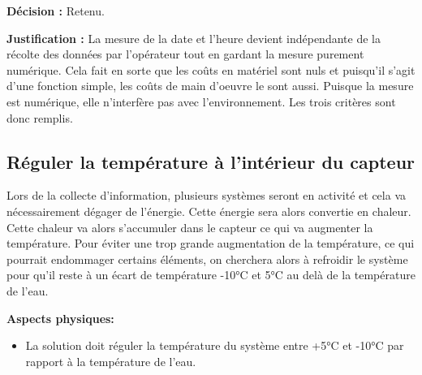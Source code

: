 \textbf{Décision :} Retenu.

\textbf{Justification :} La mesure de la date et l'heure devient indépendante de la récolte des données par l'opérateur tout en gardant la mesure purement numérique. Cela fait en sorte que les coûts en matériel sont nuls et puisqu'il s'agit d'une fonction simple, les coûts de main d'oeuvre le sont aussi. Puisque la mesure est numérique, elle n'interfère pas avec l'environnement. Les trois critères sont donc remplis.

\begin{table}[!htb]
\footnotesize
\centering
{}
\caption{Faisabilité des concepts pour mesurer la date et l'heure}
\label{t:Decision_date_heure}
\end{table}


\subsection{Réguler la température à l'intérieur du capteur}

Lors de la collecte d'information, plusieurs systèmes seront en activité et cela va nécessairement dégager de l'énergie. Cette énergie sera alors convertie en chaleur. Cette chaleur va alors s'accumuler dans le capteur ce qui va augmenter la température. Pour éviter une trop grande augmentation de la température, ce qui pourrait endommager certains éléments, on cherchera alors à refroidir le système pour qu'il reste à un écart de température -10°C et 5°C au delà de la température de l'eau.

\textbf{Aspects physiques:}
\begin{itemize}[label = {--}]
    \item La solution doit réguler la température du système entre +5°C et -10°C par rapport à la température de l'eau.
\end{itemize}

